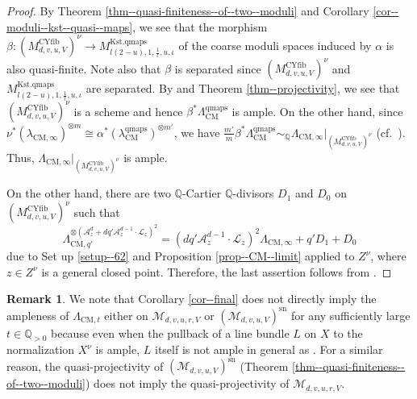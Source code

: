\documentclass[12pt,twoside]{amsart}
\theoremstyle{definition}
\newtheorem{rem}[thm]{Remark}
\begin{document}
\begin{proof}
By Theorem \ref{thm--quasi-finiteness--of--two--moduli} and Corollary \ref{cor--moduli--kst--quasi--maps}, we see that the morphism $\beta\colon (M^{\mathrm{CYfib}}_{d,v,u,V})^\nu\to M_{l(2-u),1,\frac{1}{l},u,\iota}^{\mathrm{Kst.qmaps}}$ of the coarse moduli spaces induced by $\alpha$ is also quasi-finite.
Note also that $\beta$ is separated since $(M^{\mathrm{CYfib}}_{d,v,u,V})^\nu$ and $M_{l(2-u),1,\frac{1}{l},u,\iota}^{\mathrm{Kst.qmaps}}$ are separated.
By \cite[Theorem 7.2.10]{Ols} and Theorem \ref{thm--projectivity}, we see that $(M^{\mathrm{CYfib}}_{d,v,u,V})^\nu$ is a scheme and hence $\beta^*\Lambda^{\mathrm{qmaps}}_{\mathrm{CM}}$ is ample.
On the other hand, since $\nu^*(\lambda_{\mathrm{CM},\infty})^{\otimes m}\cong \alpha^*(\lambda^{\mathrm{qmaps}}_{\mathrm{CM}})^{\otimes m'}$, we have $\frac{m'}{m}\beta^*\Lambda^{\mathrm{qmaps}}_{\mathrm{CM}}\sim_{\mathbb{Q}}\Lambda_{\mathrm{CM},\infty}|_{(M^{\mathrm{CYfib}}_{d,v,u,V})^\nu}$ (cf.~\cite[Theorem 10.3]{alper}).
Thus, $\Lambda_{\mathrm{CM},\infty}|_{(M^{\mathrm{CYfib}}_{d,v,u,V})^\nu}$ is ample.

On the other hand, there are two $\mathbb{Q}$-Cartier $\mathbb{Q}$-divisors $D_1$ and $D_0$ on $(M^{\mathrm{CYfib}}_{d,v,u,V})^\nu$ such that
\[
\Lambda_{\mathrm{CM},q'}^{\otimes (\mathcal{A}_z^d+dq'\mathcal{A}_z^{d-1}\cdot \mathcal{L}_z)^2}=(dq'\mathcal{A}_z^{d-1}\cdot \mathcal{L}_z)^2\Lambda_{\mathrm{CM},\infty}+q'D_1+D_0
\]
due to Set up \ref{setup--62} and Proposition \ref{prop--CM--limit} applied to $Z^\nu$, where $z\in Z^\nu$ is a general closed point.
Therefore, the last assertion follows from \cite[II, Exercise 7.5]{Ha}. 
\end{proof}

\begin{rem}\label{rem-Koex}
We note that Corollary \ref{cor--final} does not directly imply the ampleness of $\Lambda_{\mathrm{CM},t}$ either on $\mathcal{M}_{d,v,u,r,V}$ or $(\mathcal{M}_{d,v,u,V})^{\mathrm{sn}}$ for any sufficiently large $t\in\mathbb{Q}_{>0}$ because even when the pullback of a line bundle $L$ on $X$ to the normalization $X^\nu$ is ample, $L$ itself is not ample in general as \cite[Proposition 2]{Koex}. 
For a similar reason, the quasi-projectivity of $(\mathcal{M}_{d,v,u,V})^{\mathrm{sn}}$ (Theorem \ref{thm--quasi-finiteness--of--two--moduli}) does not imply the quasi-projectivity of $\mathcal{M}_{d,v,u,r,V}$.
\end{rem}
\end{document}
